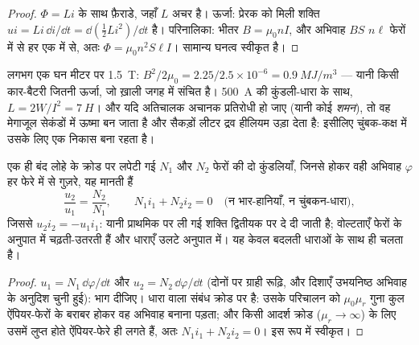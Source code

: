 \begin{proof}
$\Phi = Li$ के साथ फ़ैराडे, जहाँ $L$ अचर है। ऊर्जा: प्रेरक को मिली शक्ति
$ui = Li\,\dd i/\dd t = \dd(\tfrac12Li^2)/\dd t$ है। परिनालिका:
भीतर $B = \mu_0nI$, और अभिवाह $BS$ $n\ell$ फेरों में से हर एक में से, अतः $\Phi =
\mu_0n^2S\ell I$। सामान्य घनत्व स्वीकृत है।
\end{proof}

\begin{example}[किसी चुंबकीय अनुनाद यंत्र का चुंबक]\label{ex:b1:induction:mri}
लगभग एक घन मीटर पर \qty{1.5}{T}: $B^2/2\mu_0 = 2.25/2.5 \times 10^{-6} =
\qty{0.9}{MJ/m^3}$ --- यानी किसी कार-बैटरी जितनी ऊर्जा, जो ख़ाली जगह में
संचित है। \qty{500}{A} की कुंडली-धारा के साथ, $L = 2W/I^2 = \qty{7}{H}$। और
यदि अतिचालक अचानक प्रतिरोधी हो जाए (यानी कोई \emph{शमन}), तो वह मेगाजूल
सेकंडों में ऊष्मा बन जाता है और सैकड़ों लीटर द्रव हीलियम उड़ा देता है:
इसीलिए चुंबक-कक्ष में उसके लिए एक निकास बना रहता है।
\end{example}

\begin{proposition}[आदर्श परिणामित्र]\label{prop:b1:induction:transformer}
एक ही बंद लोहे के क्रोड पर लपेटी गई $N_1$ और $N_2$ फेरों की दो कुंडलियाँ,
जिनसे होकर वही अभिवाह $\varphi$ हर फेरे में से गुज़रे, यह मानती हैं
\[
\frac{u_2}{u_1} = \frac{N_2}{N_1} , \qquad N_1i_1 + N_2i_2 = 0 \quad\text{(न भार-हानियाँ, न चुंबकन-धारा)},
\]
जिससे $u_2i_2 = -u_1i_1$: यानी प्राथमिक पर ली गई शक्ति द्वितीयक पर दे दी
जाती है; वोल्टताएँ फेरों के अनुपात में चढ़ती-उतरती हैं और धाराएँ उलटे
अनुपात में। यह केवल बदलती धाराओं के साथ ही चलता है।
\end{proposition}

\begin{proof}
$u_1 = N_1\,\dd\varphi/\dd t$ और $u_2 = N_2\,\dd\varphi/\dd t$ (दोनों पर ग्राही
रूढ़ि, और दिशाएँ उभयनिष्ठ अभिवाह के अनुदिश चुनी हुई): भाग दीजिए।
धारा वाला संबंध क्रोड पर  है: उसके परिचालन को
$\mu_0\mu_r$ गुना कुल ऐंपियर-फेरों के बराबर होकर वह अभिवाह बनाना पड़ता; और
किसी आदर्श क्रोड ($\mu_r \to \infty$) के लिए उसमें लुप्त होते ऐंपियर-फेरे ही
लगते हैं, अतः $N_1i_1 + N_2i_2 = 0$। इस रूप में स्वीकृत।
\end{proof}

